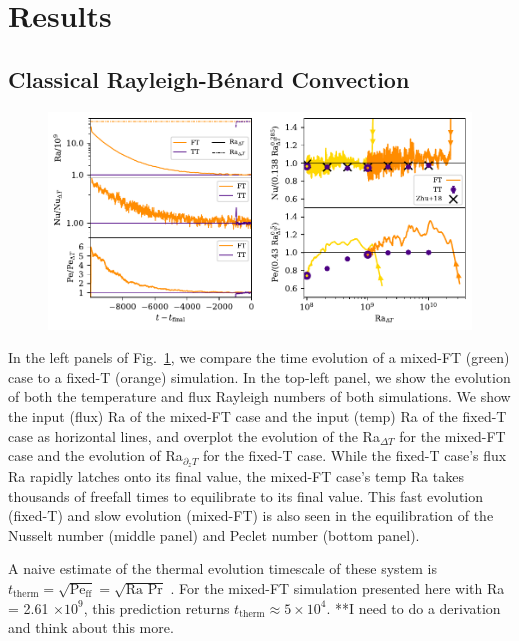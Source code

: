 \documentclass[aps, pre, onecolumn, nofootinbib, notitlepage, groupedaddress, amsfonts, amssymb, amsmath, longbibliography]{revtex4-1}
\newcommand{\RB}{Rayleigh-B\'{e}nard }
\newcommand{\Peff}{\ensuremath{\text{Pe}_{\text{ff}}}}
\begin{document}
\section{Results}
\label{sec:results}

\subsection{Classical \RB Convection}
\label{sec:2d_results}

\begin{figure}
\includegraphics[width=\textwidth]{./figs/rbc_scalar_comparisons.pdf}
\caption{ 
\label{fig:rbc_scalar_comparisons} }
\end{figure}

In the left panels of Fig.~\ref{fig:rbc_scalar_comparisons}, we compare the time evolution of a mixed-FT (green) case to a fixed-T (orange) simulation.
In the top-left panel, we show the evolution of both the temperature and flux Rayleigh numbers of both simulations.
We show the input (flux) Ra of the mixed-FT case and the input (temp) Ra of the fixed-T case as horizontal lines, and overplot the evolution of the Ra$_{\Delta T}$ for the mixed-FT case and the evolution of Ra$_{\partial_z T}$ for the fixed-T case.
While the fixed-T case's flux Ra rapidly latches onto its final value, the mixed-FT case's temp Ra takes thousands of freefall times to equilibrate to its final value.
This fast evolution (fixed-T) and slow evolution (mixed-FT) is also seen in the equilibration of the Nusselt number (middle panel) and Peclet number (bottom panel).

A naive estimate of the thermal evolution timescale of these system is $t_{\text{therm}} = \sqrt{\Peff} = \sqrt{\text{Ra Pr}}$ \cite{anders&all2018}.
For the mixed-FT simulation presented here with Ra = 2.61 $\times 10^9$, this prediction returns $t_{\text{therm}} \approx 5\times 10^{4}$.
**I need to do a derivation and think about this more.
\end{document}
